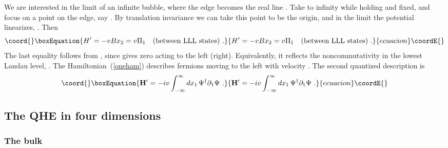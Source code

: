\documentclass[a4paper,12pt]{article}
\providecommand{\R}{R}
\begin{document}
We are interested in the limit of an infinite bubble, where the edge \coordHE{}
becomes the real line \myHighlight{$\R$}\coordHE{}.  Take \coordHE{} to infinity while holding
\coordHE{} and \coordHE{} fixed, and focus on a point on the edge, say \coordHE{}. 
By translation invariance we can take this point to be the origin, and in the
limit the potential linearizes, 
\coordHE{}.  Then
\begin{equation}\coord{}\boxEquation{
H' = -v B x_2 = v \Pi_1 \quad (\mbox{between LLL states})\ .
\label{oneham}
}{
H' = -v B x_2 = v \Pi_1 \quad (\mbox{between LLL states})\ .
}{ecuacion}\coordE{}\end{equation}
The last equality follows from \coordHE{}, since \coordHE{}  \coordHE{} gives
zero acting to the left (right).  Equivalently, it reflects the
noncommutativity in the lowest Landau level, \coordHE{}.  The
Hamiltonian~(\ref{oneham}) describes fermions moving to the left with velocity
\coordHE{}.  The second quantized description is
\begin{equation}\coord{}\boxEquation{
{\bf H}' = -iv \int_{-\infty}^\infty dx_1\, 
\Psi^\dagger
\partial_1 {
\Psi}\ .
}{
{\bf H}' = -iv \int_{-\infty}^\infty dx_1\, 
\Psi^\dagger
\partial_1 {
\Psi}\ .
}{ecuacion}\coordE{}\end{equation}

\subsection{The \coordHE{} QHE in four dimensions}

\subsubsection{The bulk}
\end{document}
